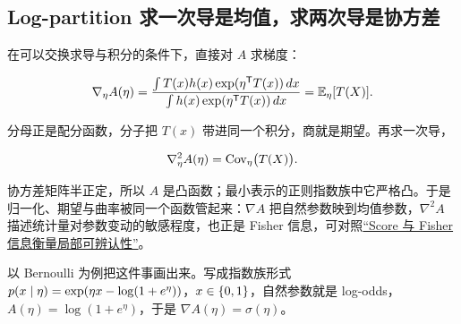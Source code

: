 \subsection{Log-partition 求一次导是均值，求两次导是协方差}

在可以交换求导与积分的条件下，直接对 \(A\) 求梯度：

\[
\nabla_\eta A(\eta)
=\frac{\int T(x)h(x)\exp(\eta^{\mathsf{T}}T(x))\,dx}
{\int h(x)\exp(\eta^{\mathsf{T}}T(x))\,dx}
=\mathbb{E}_\eta[T(X)].
\]

分母正是配分函数，分子把 \(T(x)\) 带进同一个积分，商就是期望。再求一次导，

\[
\nabla_\eta^2A(\eta)=\operatorname{Cov}_\eta\bigl(T(X)\bigr).
\]

协方差矩阵半正定，所以 \(A\) 是凸函数；最小表示的正则指数族中它严格凸。于是归一化、期望与曲率被同一个函数管起来：\(\nabla A\) 把自然参数映到均值参数，\(\nabla^2A\) 描述统计量对参数变动的敏感程度，也正是 Fisher 信息，可对照\hyperref[sec:11-Mathematical-Statistics/03-Sufficient-Statistics-and-Information/02]{``Score 与 Fisher 信息衡量局部可辨认性''}。

以 Bernoulli 为例把这件事画出来。写成指数族形式 \(p(x\mid\eta)=\exp(\eta x-\log(1+e^\eta))\)，\(x\in\left\{0,1\right\}\)，自然参数就是 log-odds，\(A(\eta)=\log(1+e^\eta)\)，于是 \(\nabla A(\eta)=\sigma(\eta)\)。


